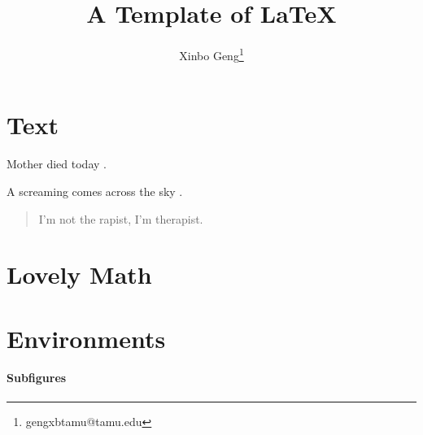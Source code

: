 \documentclass[letterpaper, 11pt]{article}
\title{A Template of \LaTeX}
\author{Xinbo Geng\thanks{gengxbtamu@tamu.edu}}
\theoremstyle{plain}
\theoremstyle{definition}
\begin{document}
\maketitle


\begin{abstract}

\end{abstract}

\tableofcontents

\newpage

\section{Text} %
\label{sec:Text}
Mother died today \cite{camus2016stranger}.

A screaming comes across the sky \cite{pynchon2012gravity}.

\begin{quote}
	I'm not the rapist, I'm therapist.
\end{quote}

\section{Lovely Math} %
\label{sec:lovely_math}


\section{Environments} %
\label{sec:environments}
\paragraph{Subfigures} %
\label{par:subfigures}


\newpage




\end{document}
